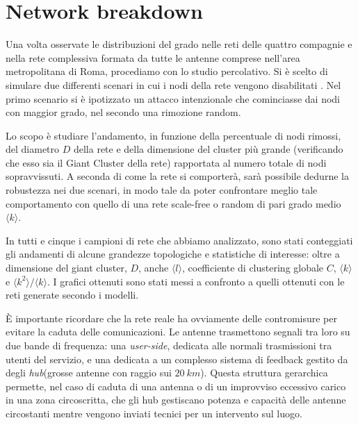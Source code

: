 \clearpage
\section{Network breakdown}
\label{sec:attaack}

Una volta osservate le distribuzioni del grado nelle reti delle quattro compagnie e nella rete complessiva formata da tutte le antenne comprese nell'area metropolitana di Roma, procediamo con lo studio percolativo. Si è scelto di simulare due differenti scenari in cui i nodi della rete vengono disabilitati \textcite{Barbalbert2000}. Nel primo scenario si è ipotizzato un attacco intenzionale che cominciasse dai nodi con maggior grado, nel secondo una rimozione random.

Lo scopo è studiare l'andamento, in funzione della percentuale di nodi rimossi, del diametro $D$ della rete e della dimensione del cluster più grande (verificando che esso sia il Giant Cluster della rete) rapportata al numero totale di nodi sopravvissuti. A seconda di come la rete si comporterà, sarà possibile dedurne la robustezza nei due scenari, in modo tale da poter confrontare meglio tale comportamento con quello di una rete scale-free o random di pari grado medio $\langle k \rangle$.

In tutti e cinque i campioni di rete che abbiamo analizzato, sono stati conteggiati gli andamenti di alcune grandezze topologiche e statistiche di interesse: oltre a dimensione del giant cluster, $D$, anche $\langle l \rangle$, coefficiente di clustering globale $C$, $\langle k \rangle$ e $\langle k^2 \rangle/\langle k \rangle$. I grafici ottenuti sono stati messi a confronto a quelli ottenuti con le reti generate secondo i modelli.

È importante ricordare che la rete reale ha ovviamente delle contromisure per evitare la caduta delle comunicazioni. Le antenne trasmettono segnali tra loro su due bande di frequenza: una \emph{user-side}, dedicata alle normali trasmissioni tra utenti del servizio, e una dedicata a un complesso sistema di feedback gestito da degli \emph{hub}(grosse antenne con raggio sui $20\:km$). Questa struttura gerarchica permette, nel caso di caduta di una antenna o di un improvviso eccessivo carico in una zona circoscritta, che gli hub gestiscano potenza e capacità delle antenne circostanti mentre vengono inviati tecnici per un intervento sul luogo.

